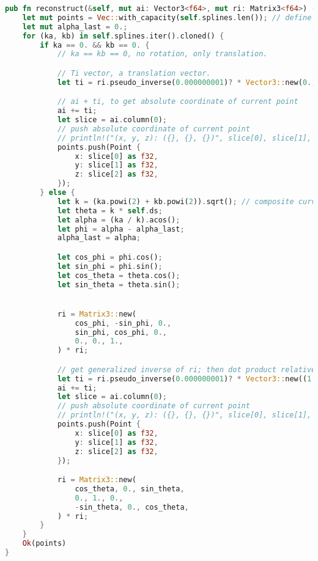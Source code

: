 \cleardoublepage
{}

\begin{lstlisting}[language=Rust, style=boxed]
pub fn reconstruct(&self, mut ai: Vector3<f64>, mut ri: Matrix3<f64>) -> Result<Vec<Point>, &'static str> {
    let mut points = Vec::with_capacity(self.splines.len()); // define points vector and reserve capacity
    let mut alpha_last = 0.;
    for (ka, kb) in self.splines.iter().cloned() {
        if ka == 0. && kb == 0. {
            // ka == kb == 0, no rotation, only translation.

            // Ti vector, a translation vector.
            let ti = ri.pseudo_inverse(0.000000001)? * Vector3::new(0., 0., self.ds);

            // ai + ti, to get absolute coordinate of current point
            ai += ti;
            let slice = ai.column(0);
            // push absolute coordinate of current point
            // println!("(x, y, z): ({}, {}, {})", slice[0], slice[1], slice[2]);
            points.push(Point {
                x: slice[0] as f32,
                y: slice[1] as f32,
                z: slice[2] as f32,
            });
        } else {
            let k = (ka.powi(2) + kb.powi(2)).sqrt(); // composite curvature
            let theta = k * self.ds;
            let alpha = (ka / k).acos();
            let phi = alpha - alpha_last;
            alpha_last = alpha;

            let cos_phi = phi.cos();
            let sin_phi = phi.sin();
            let cos_theta = theta.cos();
            let sin_theta = theta.sin();


            ri = Matrix3::new(
                cos_phi, -sin_phi, 0.,
                sin_phi, cos_phi, 0.,
                0., 0., 1.,
            ) * ri;

            // get generalized inverse of ri; then dot product relative coordinate
            let ti = ri.pseudo_inverse(0.000000001)? * Vector3::new((1. - cos_theta) / k, 0., sin_theta / k);
            ai += ti;
            let slice = ai.column(0);
            // push absolute coordinate of current point
            // println!("(x, y, z): ({}, {}, {})", slice[0], slice[1], slice[2]);
            points.push(Point {
                x: slice[0] as f32,
                y: slice[1] as f32,
                z: slice[2] as f32,
            });

            ri = Matrix3::new(
                cos_theta, 0., sin_theta,
                0., 1., 0.,
                -sin_theta, 0., cos_theta,
            ) * ri;
        }
    }
    Ok(points)
}
\end{lstlisting}

